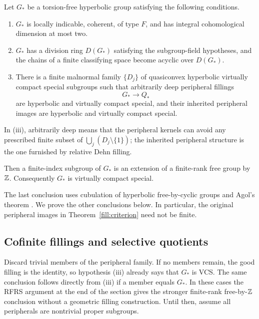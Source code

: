 \begin{theorem}\label{fill:criterion}
Let \(G_*\) be a torsion-free hyperbolic group satisfying the following
conditions.
\begin{enumerate}[label=\textup{(\roman*)}]
\item \(G_*\) is locally indicable, coherent, of type \(F\), and has integral
cohomological dimension at most two.
\item \(G_*\) has a division ring \(D(G_*)\) satisfying the subgroup-field
hypotheses, and the chains of a finite classifying space become acyclic over
\(D(G_*)\).
\item There is a finite malnormal family \(\{D_j\}\) of quasiconvex
hyperbolic virtually compact special subgroups such that arbitrarily deep
peripheral fillings
\[
 G_*\longrightarrow Q_*
\]
are hyperbolic and virtually compact special, and their inherited peripheral
images are hyperbolic and virtually compact special.
\end{enumerate}
In \textup{(iii)}, arbitrarily deep means that the peripheral kernels can
avoid any prescribed finite subset of
\(\bigcup_j(D_j\setminus\{1\})\); the inherited peripheral structure is the
one furnished by relative Dehn filling.

Then a finite-index subgroup of \(G_*\) is an extension of a finite-rank free
group by \(\mathbb Z\).  Consequently \(G_*\) is virtually compact special.
\end{theorem}

The last conclusion uses cubulation of hyperbolic free-by-cyclic groups
\cite{HagenWise2016} and Agol's theorem \cite{Agol2013}.  We prove the other
conclusions below.  In particular, the original peripheral images in
Theorem~\ref{fill:criterion} need not be finite.

\subsection{Cofinite fillings and selective quotients}

Discard trivial members of the peripheral family. If no members remain,
the good filling is the identity, so hypothesis (iii) already says that
\(G_*\) is VCS. The same conclusion follows directly from (iii) if a
member equals \(G_*\). In these cases the RFRS argument at the end of the
section gives the stronger finite-rank free-by-\(\mathbb Z\) conclusion without
a geometric filling construction. Until then, assume all peripherals
are nontrivial proper subgroups.

